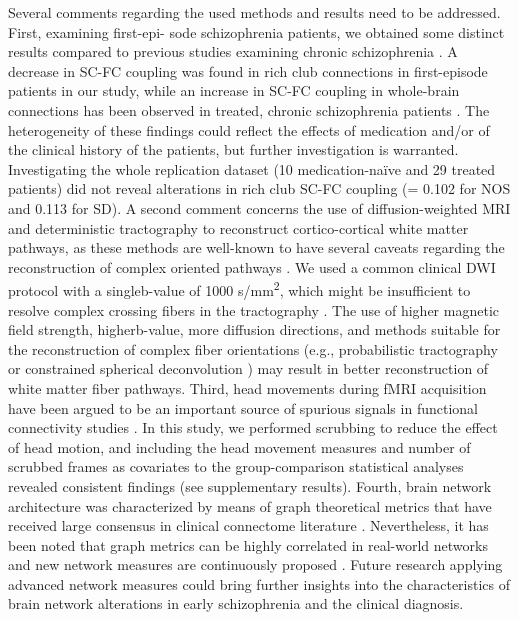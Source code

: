 \begin{refsection}
Several comments regarding the used methods and results need to be addressed. First, examining first-epi- sode schizophrenia patients, we obtained some distinct results compared to previous studies examining chronic schizophrenia \citep{vanDenHeuvel2013AbnormalRC,Yeo2016GraphMO,Klauser2017WhiteMD}. A decrease in SC-FC coupling was found in rich club connections in first-episode patients in our study, while an increase in SC-FC coupling in whole-brain connections has been observed in treated, chronic schizophrenia patients \citep{vanDenHeuvel2013AbnormalRC}. The heterogeneity of these findings could reflect the effects of medication and/or of the clinical history of the patients, but further investigation is warranted. Investigating the whole replication dataset (10 medication-na\"{i}ve and 29 treated patients) did not reveal alterations in rich club SC-FC coupling (\pval = 0.102 for NOS and 0.113 for SD). A second comment concerns the use of diffusion-weighted MRI and deterministic tractography to reconstruct cortico-cortical white matter pathways, as these methods are well-known to have several caveats regarding the reconstruction of complex oriented pathways \citep{Jbabdi2011TractographyWD}. We used a common clinical DWI protocol with a singleb-value of 1000 s/mm\textsuperscript{2}, which might be insufficient to resolve complex crossing fibers in the tractography \citep{Weiss2015ImprovedNA,Tournier2007RobustDO,Tournier2004DirectEO}. The use of higher magnetic field strength, higherb-value, more diffusion directions, and methods suitable for the reconstruction of complex fiber orientations (e.g., probabilistic tractography \citep{Behrens2007ProbabilisticDT} or constrained spherical deconvolution \citep{Tournier2007RobustDO,Tournier2004DirectEO}) may result in better reconstruction of white matter fiber pathways. Third, head movements during fMRI acquisition have been argued to be an important source of spurious signals in functional connectivity studies \citep{Power2012SpuriousBS,Yan2013ACA}. In this study, we performed scrubbing to reduce the effect of head motion, and including the head movement measures and number of scrubbed frames as covariates to the group-comparison statistical analyses revealed consistent findings (see supplementary results). Fourth, brain network architecture was characterized by means of graph theoretical metrics that have received large consensus in clinical connectome literature \citep{Fornito2012SchizophreniaNA,Heuvel2014BrainNI,Griffa2013StructuralCI,Fornito2015ConnectomicsAN}. Nevertheless, it has been noted that graph metrics can be highly correlated in real-world networks \citep{sporns_human_2005} and new network measures are continuously proposed \citep{Bertolero2017TheDC,Betzel2017MultiscaleBN}. Future research applying advanced network measures could bring further insights into the characteristics of brain network alterations in early schizophrenia and the clinical diagnosis.


\end{refsection}
